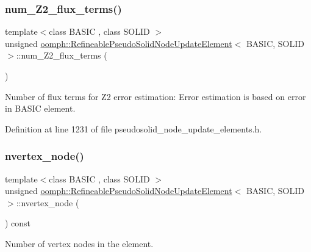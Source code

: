 \subsubsection{\texorpdfstring{num\+\_\+\+Z2\+\_\+flux\+\_\+terms()}{num\_Z2\_flux\_terms()}}
{\footnotesize\ttfamily template$<$class B\+A\+S\+IC , class S\+O\+L\+ID $>$ \\
unsigned \hyperlink{classoomph_1_1RefineablePseudoSolidNodeUpdateElement}{oomph\+::\+Refineable\+Pseudo\+Solid\+Node\+Update\+Element}$<$ B\+A\+S\+IC, S\+O\+L\+ID $>$\+::num\+\_\+\+Z2\+\_\+flux\+\_\+terms (\begin{DoxyParamCaption}{ }\end{DoxyParamCaption})\hspace{0.3cm}{\ttfamily [inline]}}



Number of \textquotesingle{}flux\textquotesingle{} terms for Z2 error estimation\+: Error estimation is based on error in B\+A\+S\+IC element. 



Definition at line 1231 of file pseudosolid\+\_\+node\+\_\+update\+\_\+elements.\+h.

\mbox{\label{classoomph_1_1RefineablePseudoSolidNodeUpdateElement_a2d8820cdbca56cf4c913b8d1baab7102}} 
\subsubsection{\texorpdfstring{nvertex\+\_\+node()}{nvertex\_node()}}
{\footnotesize\ttfamily template$<$class B\+A\+S\+IC , class S\+O\+L\+ID $>$ \\
unsigned \hyperlink{classoomph_1_1RefineablePseudoSolidNodeUpdateElement}{oomph\+::\+Refineable\+Pseudo\+Solid\+Node\+Update\+Element}$<$ B\+A\+S\+IC, S\+O\+L\+ID $>$\+::nvertex\+\_\+node (\begin{DoxyParamCaption}{ }\end{DoxyParamCaption}) const\hspace{0.3cm}{\ttfamily [inline]}}



Number of vertex nodes in the element. 




